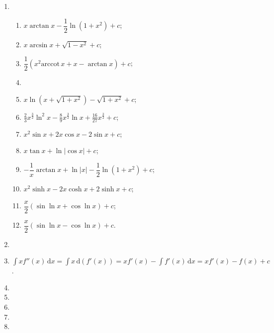 \documentclass[a4paper, 11pt]{ctexart}
\newcommand{\arccot}{\mathrm{arccot}\,}
\newcommand{\dif}{\mathrm{d}}
\begin{document}
\begin{enumerate}
    \item %
        \begin{enumerate}[(1)]
            \item %
                $x\arctan x - \dfrac12\ln(1+x^2) + c$;
            \item %
                $x\arcsin x + \sqrt{1-x^2} + c$;
            \item %
                $\dfrac12(x^2\arccot x + x - \arctan x) + c$;
            \item %
            \item %
                $x\ln(x + \sqrt{1 + x^2}) - \sqrt{1 + x^2} + c$;
            \item %
                $\displaystyle{
                    \frac23x^{\frac32}\ln^2x - \frac89x^{\frac32}\ln x + \frac{16}{27}x^{\frac32} + c 
                }$;
            \item %
                $x^2\sin x + 2x\cos x - 2\sin x + c$;
            \item %
                $x\tan x + \ln|\cos x| + c$;
            \item %
                $-\dfrac1x\arctan x + \ln|x| - \dfrac12\ln(1 + x^2) + c$;
            \item %
                $x^2\sinh x - 2x\cosh x + 2\sinh x + c$;
            \item %
                $\dfrac{x}{2}(\sin\ln x + \cos\ln x) + c$;
            \item %
                $\dfrac{x}{2}(\sin\ln x - \cos\ln x) + c$.
        \end{enumerate}
    \item %
    \item %
        $\displaystyle{
            \int xf''(x)\,\dif x = \int x\,\dif(f'(x)) = xf'(x) - \int f'(x)\,\dif x = xf'(x) - f(x) + c
        }$.
    \item %
    \item %
    \item %
    \item %
    \item %
\end{enumerate}
\end{document}
